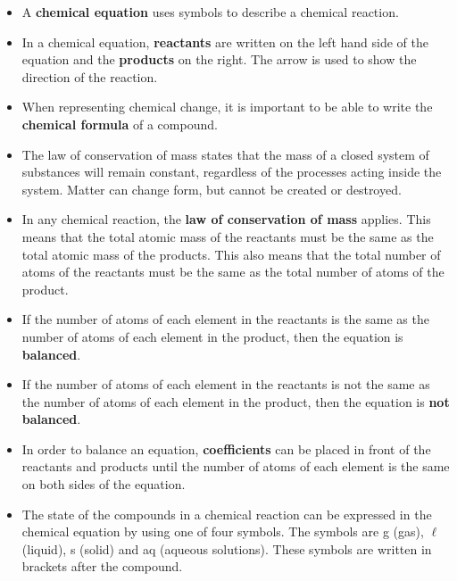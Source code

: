             \nopagebreak
      \label{m38727*id67171}\begin{itemize}[noitemsep]
            \label{m38727*uid36}\item A \textbf{chemical equation} uses symbols to describe a chemical reaction.
\label{m38727*uid37}\item In a chemical equation, \textbf{reactants} are written on the left hand side of the equation and the \textbf{products} on the right. The arrow is used to show the direction of the reaction.
\label{m38727*uid38}\item When representing chemical change, it is important to be able to write the \textbf{chemical formula} of a compound.
\item The law of conservation of mass states that the mass of a closed system of substances will remain constant, regardless of the processes acting inside the system. Matter can change form, but cannot be created or destroyed.
\label{m38727*uid39}\item In any chemical reaction, the \textbf{law of conservation of mass} applies. This means that the total atomic mass of the reactants must be the same as the total atomic mass of the products. This also means that the total number of atoms of the reactants must be the same as the total number of atoms of the product.
\label{m38727*uid40}\item If the number of atoms of each element in the reactants is the same as the number of atoms of each element in the product, then the equation is \textbf{balanced}.
\label{m38727*uid41}\item If the number of atoms of each element in the reactants is not the same as the number of atoms of each element in the product, then the equation is \textbf{not balanced}.
\label{m38727*uid42}\item In order to balance an equation, \textbf{coefficients} can be placed in front of the reactants and products until the number of atoms of each element is the same on both sides of the equation.
\item The state of the compounds in a chemical reaction can be expressed in the chemical equation by using one of four symbols. The symbols are g (gas), $\ell$ (liquid), s (solid) and aq (aqueous solutions). These symbols are written in brackets after the compound.
\end{itemize}
